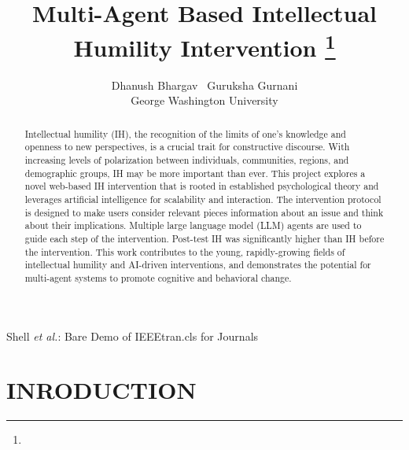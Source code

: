\documentclass[journal]{IEEEtran}
\begin{document}
\raggedbottom

\title{\ \\ \LARGE\bf Multi-Agent Based Intellectual Humility Intervention \thanks{}}

\author{Dhanush Bhargav \ Guruksha Gurnani \\ George Washington University}
%
{Shell \MakeLowercase{\textit{et al.}}: Bare Demo of IEEEtran.cls for Journals}
\maketitle

\begin{abstract}
Intellectual humility (IH), the recognition of the limits of one's knowledge and openness to new perspectives, is a crucial trait for constructive discourse. With increasing levels of polarization between individuals, communities, regions, and demographic groups, IH may be more important than ever. This project explores a novel web-based IH intervention that is rooted in established psychological theory and leverages artificial intelligence for scalability and interaction. The intervention protocol is designed to make users consider relevant pieces information about an issue and think about their implications. Multiple large language model (LLM) agents are used to guide each step of the intervention. Post-test IH was significantly higher than IH before the intervention. This work contributes to the young, rapidly-growing fields of intellectual humility and AI-driven interventions, and demonstrates the potential for multi-agent systems to promote cognitive and behavioral change.
\end{abstract}
\section{INRODUCTION}
\end{document}
